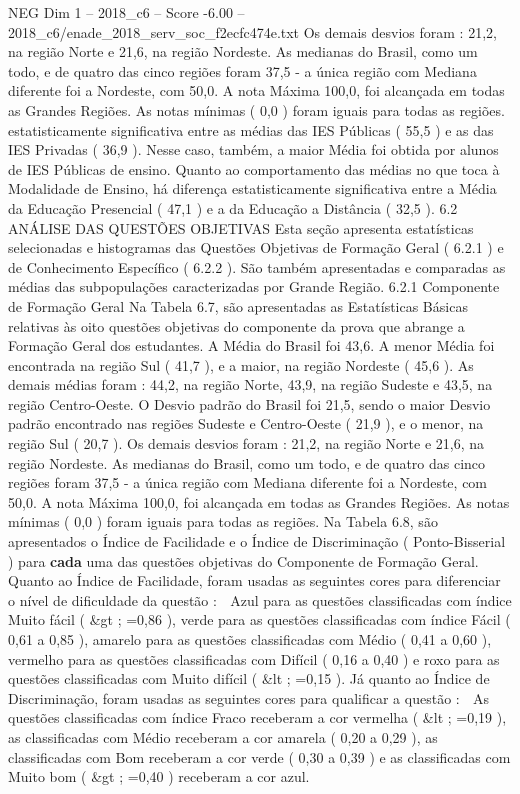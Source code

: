 \begin{textsample}{NEG Dim 1 – 2018\_c6 – Score -6.00 – 2018\_c6/enade\_2018\_serv\_soc\_f2ecfc474e.txt}
Os demais desvios foram : 21,2, na região Norte e 21,6, na região Nordeste.
As medianas do Brasil, como um todo, e de quatro das cinco regiões foram 37,5 - a única região com Mediana diferente foi a Nordeste, com 50,0.
A nota Máxima 100,0, foi alcançada em todas as Grandes Regiões.
As notas mínimas ( 0,0 ) foram iguais para todas as regiões. estatisticamente significativa entre as médias das IES Públicas ( 55,5 ) e as das IES Privadas ( 36,9 ).
Nesse caso, também, a maior Média foi obtida por alunos de IES Públicas de ensino.
Quanto ao comportamento das médias no que toca à Modalidade de Ensino, há diferença estatisticamente significativa entre a Média da Educação Presencial ( 47,1 ) e a da Educação a Distância ( 32,5 ). 6.2 ANÁLISE DAS QUESTÕES OBJETIVAS Esta seção apresenta estatísticas selecionadas e histogramas das Questões Objetivas de Formação Geral ( 6.2.1 ) e de Conhecimento Específico ( 6.2.2 ).
São também apresentadas e comparadas as médias das subpopulações caracterizadas por Grande Região. 6.2.1 Componente de Formação Geral Na Tabela 6.7, são apresentadas as Estatísticas Básicas relativas às oito questões objetivas do componente da prova que abrange a Formação Geral dos estudantes.
A Média do Brasil foi 43,6.
A menor Média foi encontrada na região Sul ( 41,7 ), e a maior, na região Nordeste ( 45,6 ).
As demais médias foram : 44,2, na região Norte, 43,9, na região Sudeste e 43,5, na região Centro-Oeste.
O Desvio padrão do Brasil foi 21,5, sendo o maior Desvio padrão encontrado nas regiões Sudeste e Centro-Oeste ( 21,9 ), e o menor, na região Sul ( 20,7 ).
Os demais desvios foram : 21,2, na região Norte e 21,6, na região Nordeste.
As medianas do Brasil, como um todo, e de quatro das cinco regiões foram 37,5 - a única região com Mediana diferente foi a Nordeste, com 50,0.
A nota Máxima 100,0, foi alcançada em todas as Grandes Regiões.
As notas mínimas ( 0,0 ) foram iguais para todas as regiões.
Na Tabela 6.8, são apresentados o Índice de Facilidade e o Índice de Discriminação ( Ponto-Bisserial ) para \textbf{cada} uma das questões objetivas do Componente de Formação Geral.
Quanto ao Índice de Facilidade, foram usadas as seguintes cores para diferenciar o nível de dificuldade da questão :  Azul para as questões classificadas com índice Muito fácil ( \&gt ; =0,86 ), verde para as questões classificadas com índice Fácil ( 0,61 a 0,85 ), amarelo para as questões classificadas com Médio ( 0,41 a 0,60 ), vermelho para as questões classificadas com Difícil ( 0,16 a 0,40 ) e roxo para as questões classificadas com Muito difícil ( \&lt ; =0,15 ).
Já quanto ao Índice de Discriminação, foram usadas as seguintes cores para qualificar a questão :  As questões classificadas com índice Fraco receberam a cor vermelha ( \&lt ; =0,19 ), as classificadas com Médio receberam a cor amarela ( 0,20 a 0,29 ), as classificadas com Bom receberam a cor verde ( 0,30 a 0,39 ) e as classificadas com Muito bom ( \&gt ; =0,40 ) receberam a cor azul.

\end{textsample}
